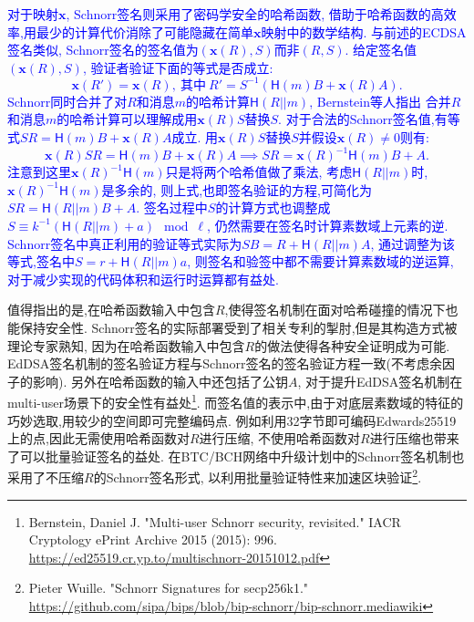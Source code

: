 \textcolor{blue}{
对于映射$\mathbf{x}$, Schnorr签名则采用了密码学安全的哈希函数,
借助于哈希函数的高效率,用最少的计算代价消除了可能隐藏在简单$\mathbf{x}$映射中的数学结构.
与前述的ECDSA签名类似, Schnorr签名的签名值为$(\mathbf{x}(R), S)$而非$(R,S)$.
给定签名值$(\mathbf{x}(R), S)$, 验证者验证下面的等式是否成立:
$$\mathbf{x}(R') = \mathbf{x}(R),\ \text{其中}\ R' = S^{-1}(\textsf{H}(m)B + \mathbf{x}(R)A) .$$
Schnorr同时合并了对$R$和消息$m$的哈希计算$\textsf{H}(R||m)$, Bernstein等人指出
合并$R$和消息$m$的哈希计算可以理解成用$\mathbf{x}(R)S$替换$S$.
对于合法的Schnorr签名值,有等式$SR = \textsf{H}(m)B + \mathbf{x}(R)A$成立.
用$\mathbf{x}(R)S$替换$S$并假设$\mathbf{x}(R)\neq0$则有:
$$\mathbf{x}(R)SR = \textsf{H}(m)B + \mathbf{x}(R)A \implies 
SR = \mathbf{x}(R)^{-1}\textsf{H}(m)B + A.$$
注意到这里$\mathbf{x}(R)^{-1}\textsf{H}(m)$只是将两个哈希值做了乘法,
考虑$\textsf{H}(R||m)$时, $\mathbf{x}(R)^{-1}\textsf{H}(m)$是多余的,
则上式,也即签名验证的方程,可简化为$SR = \textsf{H}(R||m)B + A$.
签名过程中$S$的计算方式也调整成$S \equiv k^{-1}(\textsf{H}(R||m) + a) \mod \ell$,
仍然需要在签名时计算素数域上元素的逆.
Schnorr签名中真正利用的验证等式实际为$SB = R+ \textsf{H}(R||m)A$,
通过调整为该等式,签名中$S = r + \textsf{H}(R||m) a$, 则签名和验签中都不需要计算素数域的逆运算,
对于减少实现的代码体积和运行时运算都有益处.
}

值得指出的是,在哈希函数输入中包含$R$,使得签名机制在面对哈希碰撞的情况下也能保持安全性.
Schnorr签名的实际部署受到了相关专利的掣肘,但是其构造方式被理论专家熟知,
因为在哈希函数输入中包含$R$的做法使得各种安全证明成为可能.
EdDSA签名机制的签名验证方程与Schnorr签名的签名验证方程一致(不考虑余因子的影响).
另外在哈希函数的输入中还包括了公钥$A$, 
对于提升EdDSA签名机制在multi-user场景下的安全性有益处\footnote{
Bernstein, Daniel J. "Multi-user Schnorr security, revisited." 
IACR Cryptology ePrint Archive 2015 (2015): 996.
\url{https://ed25519.cr.yp.to/multischnorr-20151012.pdf}}.
而签名值的表示中,由于对底层素数域的特征的巧妙选取,用较少的空间即可完整编码点.
例如利用32字节即可编码Edwards25519上的点,因此无需使用哈希函数对$R$进行压缩,
不使用哈希函数对$R$进行压缩也带来了可以批量验证签名的益处.
在BTC/BCH网络中升级计划中的Schnorr签名机制也采用了不压缩$R$的Schnorr签名形式,
以利用批量验证特性来加速区块验证\footnote{
Pieter Wuille. "Schnorr Signatures for secp256k1."
\url{https://github.com/sipa/bips/blob/bip-schnorr/bip-schnorr.mediawiki}}.

